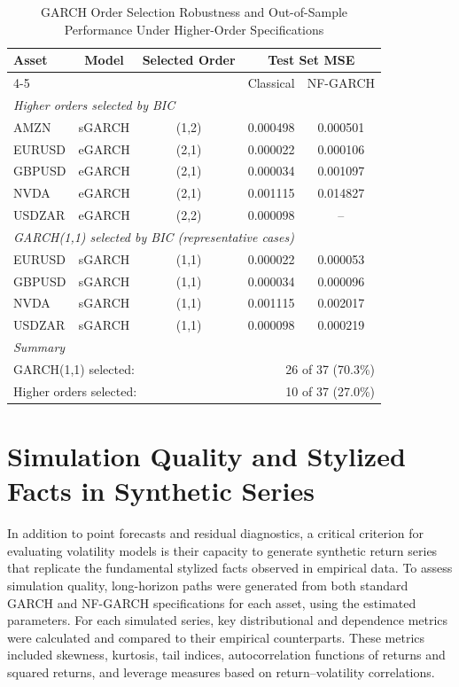 \documentclass[oneside,12pt]{CUEDthesisPSnPDF}
\begin{document}
\clearpage
\begin{table}[h]
\centering
\caption{GARCH Order Selection Robustness and Out-of-Sample Performance Under Higher-Order Specifications}
\small
\begin{tabular}{lcccc}
\toprule
\label{tab:garch_order_selection}
Asset & Model & Selected Order & \multicolumn{2}{c}{Test Set MSE} \\
\cmidrule(lr){4-5}
& & & Classical & NF-GARCH \\
\midrule
\multicolumn{5}{l}{\textit{Higher orders selected by BIC}} \\
\midrule
AMZN   & sGARCH & (1,2) & 0.000498 & 0.000501 \\
EURUSD & eGARCH & (2,1) & 0.000022 & 0.000106 \\
GBPUSD & eGARCH & (2,1) & 0.000034 & 0.001097 \\
NVDA   & eGARCH & (2,1) & 0.001115 & 0.014827 \\
USDZAR & eGARCH & (2,2) & 0.000098 & -- \\
\midrule
\multicolumn{5}{l}{\textit{GARCH(1,1) selected by BIC (representative cases)}} \\
\midrule
EURUSD & sGARCH & (1,1) & 0.000022 & 0.000053 \\
GBPUSD & sGARCH & (1,1) & 0.000034 & 0.000096 \\
NVDA   & sGARCH & (1,1) & 0.001115 & 0.002017 \\
USDZAR & sGARCH & (1,1) & 0.000098 & 0.000219 \\
\midrule
\multicolumn{5}{l}{\textit{Summary}} \\
\midrule
\multicolumn{3}{l}{GARCH(1,1) selected:} & \multicolumn{2}{r}{26 of 37 (70.3\%)} \\
\multicolumn{3}{l}{Higher orders selected:} & \multicolumn{2}{r}{10 of 37 (27.0\%)} \\
\bottomrule
\end{tabular}
\end{table}


\section{Simulation Quality and Stylized Facts in Synthetic Series}
\label{sec:simulation_quality}
\noindent
In addition to point forecasts and residual diagnostics, a critical criterion for evaluating volatility models is their capacity to generate synthetic return series that replicate the fundamental stylized facts observed in empirical data. To assess simulation quality, long-horizon paths were generated from both standard GARCH and NF-GARCH specifications for each asset, using the estimated parameters. For each simulated series, key distributional and dependence metrics were calculated and compared to their empirical counterparts. These metrics included skewness, kurtosis, tail indices, autocorrelation functions of returns and squared returns, and leverage measures based on return–volatility correlations.\\
\end{document}
